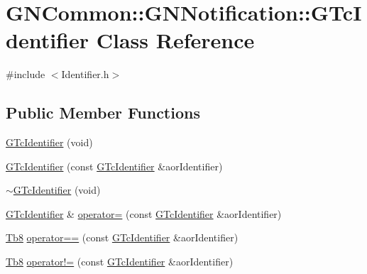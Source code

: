 \hypertarget{class_g_n_common_1_1_g_n_notification_1_1_g_tc_identifier}{}\section{G\+N\+Common\+:\+:G\+N\+Notification\+:\+:G\+Tc\+Identifier Class Reference}
\label{class_g_n_common_1_1_g_n_notification_1_1_g_tc_identifier}


{\ttfamily \#include $<$Identifier.\+h$>$}

\subsection*{Public Member Functions}
\begin{DoxyCompactItemize}
\item 
\mbox{\hyperlink{class_g_n_common_1_1_g_n_notification_1_1_g_tc_identifier_a19d375f605d5f504d6c1b119916c474b}{G\+Tc\+Identifier}} (void)
\item 
\mbox{\hyperlink{class_g_n_common_1_1_g_n_notification_1_1_g_tc_identifier_a189028de7c5fbbde1ba30fe1a6525e43}{G\+Tc\+Identifier}} (const \mbox{\hyperlink{class_g_n_common_1_1_g_n_notification_1_1_g_tc_identifier}{G\+Tc\+Identifier}} \&aor\+Identifier)
\item 
\mbox{\hyperlink{class_g_n_common_1_1_g_n_notification_1_1_g_tc_identifier_a52743b4f0217c00b0af8cc7f72e42f8a}{$\sim$\+G\+Tc\+Identifier}} (void)
\item 
\mbox{\hyperlink{class_g_n_common_1_1_g_n_notification_1_1_g_tc_identifier}{G\+Tc\+Identifier}} \& \mbox{\hyperlink{class_g_n_common_1_1_g_n_notification_1_1_g_tc_identifier_af1b94ca6c81713c79e8a0b62e541db21}{operator=}} (const \mbox{\hyperlink{class_g_n_common_1_1_g_n_notification_1_1_g_tc_identifier}{G\+Tc\+Identifier}} \&aor\+Identifier)
\item 
\mbox{\hyperlink{namespace_g_n_common_a8115dc7ed53b6e5b52e6bfde1632ea74}{Tb8}} \mbox{\hyperlink{class_g_n_common_1_1_g_n_notification_1_1_g_tc_identifier_aad336ee2e2570c3e635d6d95a8b21abc}{operator==}} (const \mbox{\hyperlink{class_g_n_common_1_1_g_n_notification_1_1_g_tc_identifier}{G\+Tc\+Identifier}} \&aor\+Identifier)
\item 
\mbox{\hyperlink{namespace_g_n_common_a8115dc7ed53b6e5b52e6bfde1632ea74}{Tb8}} \mbox{\hyperlink{class_g_n_common_1_1_g_n_notification_1_1_g_tc_identifier_a3a93f5bf62f84d2f11a47b65c3d8fbd3}{operator!=}} (const \mbox{\hyperlink{class_g_n_common_1_1_g_n_notification_1_1_g_tc_identifier}{G\+Tc\+Identifier}} \&aor\+Identifier)
\end{DoxyCompactItemize}
